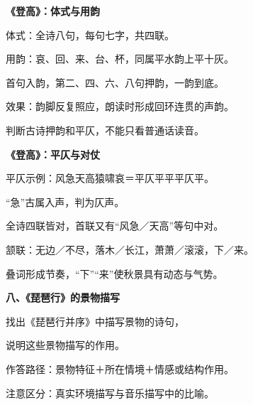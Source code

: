\documentclass[UTF8,10pt,aspectratio=169]{ctexbeamer}
\newcommand{\PageHeading}[1]{\begin{center}{\Large\bfseries #1}\end{center}\vspace{0.2cm}}
\begin{document}
\begin{frame}
\PageHeading{《登高》：体式与用韵}
体式：全诗八句，每句七字，共四联。\par\vspace{0.23cm}
用韵：哀、回、来、台、杯，同属平水韵上平十灰。\par\vspace{0.23cm}
首句入韵，第二、四、六、八句押韵，一韵到底。\par\vspace{0.23cm}
效果：韵脚反复照应，朗读时形成回环连贯的声韵。\par\vspace{0.23cm}
判断古诗押韵和平仄，不能只看普通话读音。\par\vspace{0.23cm}
\end{frame}
\begin{frame}
\PageHeading{《登高》：平仄与对仗}
平仄示例：风急天高猿啸哀＝平仄平平平仄平。\par\vspace{0.23cm}
“急”古属入声，判为仄声。\par\vspace{0.23cm}
全诗四联皆对，首联又有“风急／天高”等句中对。\par\vspace{0.23cm}
颔联：无边／不尽，落木／长江，萧萧／滚滚，下／来。\par\vspace{0.23cm}
叠词形成节奏，“下”“来”使秋景具有动态与气势。\par\vspace{0.23cm}
\end{frame}
\begin{frame}
\PageHeading{八、《琵琶行》的景物描写}
找出《琵琶行并序》中描写景物的诗句，\par\vspace{0.23cm}
说明这些景物描写的作用。\par\vspace{0.23cm}
作答路径：景物特征＋所在情境＋情感或结构作用。\par\vspace{0.23cm}
注意区分：真实环境描写与音乐描写中的比喻。\par\vspace{0.23cm}
\end{frame}
\end{document}
